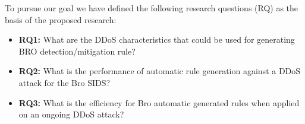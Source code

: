 


To pursue our goal we have defined the following research questions (RQ) as the basis of the proposed research:





\begin{itemize}	
	\item \textbf{RQ1:} What are the DDoS characteristics that could be used for generating BRO detection/mitigation rule?
	\item \textbf{RQ2:} What is the performance of automatic rule generation against a DDoS attack for the Bro SIDS?
	 \item \textbf{RQ3:} What is the efficiency for Bro automatic generated rules when applied on an ongoing DDoS attack?
\end{itemize}

